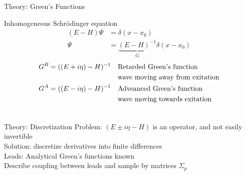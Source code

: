 \documentclass{beamer}
\begin{document}
%
%

\begin{frame}{Theory: Green's Functions}
    \begin{center}
        Inhomogeneous Schrödinger equation
        \begin{align*}
            (E-H) \Psi &= \delta(x-x_0)\\
            \Psi       &= \underbrace{(E-H)^{-1}}_{G} \delta(x-x_0)
        \end{align*}
        \pause
        \begin{align*}
            G^R = ((E + i \eta) -H)^{-1}\quad & \textnormal{Retarded Green's
            function}\\
            \qquad & \textnormal{wave moving away from exitation}\\
            G^A = ((E - i \eta) -H)^{-1}\quad & \textnormal{Adveanced Green's
            function}\\
            \qquad & \textnormal{wave moving towards exitation}
        \end{align*}

        \begin{align*}
        \end{align*}
   \end{center}
\end{frame}

\begin{frame}{Theory: Discretization}
    Problem: $(E\pm i\eta-H)$ is an operator, and not easily invertible\\[1em]

    \pause
    Solution: discretize derivatives into finite differences\\[1em]

    \pause
    Leads: Analytical Green's functions known\\[1em]

    \pause
    Describe coupling between leads and sample by matrices $\Sigma_p$
\end{frame}
\end{document}
